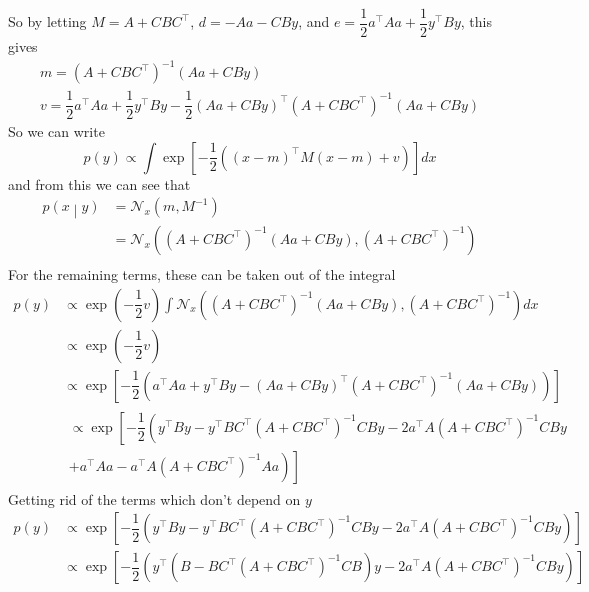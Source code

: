\documentclass[11pt]{report} %
\begin{document}
So by letting $M = A + CBC^{\top}$, $d = -Aa - CBy$, and $e = \dfrac{1}{2}a^{\top}Aa + \dfrac{1}{2}y^{\top}By$, this gives
\begin{gather}
m = \left(A + CBC^{\top}\right)^{-1}\left(Aa + CBy\right) \\
v = \dfrac{1}{2}a^{\top}Aa + \dfrac{1}{2}y^{\top}By - \dfrac{1}{2}\left(Aa + CBy\right)^{\top}\left(A + CBC^{\top}\right)^{-1}\left(Aa + CBy\right)
\end{gather}
So we can write
\begin{equation}
p\left(y\right)\propto\int\exp\left[-\dfrac{1}{2}\left(\left(x-m\right)^{\top}M\left(x-m\right)+v\right)\right]dx
\end{equation}
and from this we can see that
\begin{align}
p\left(x\middle|y\right) &= \mathcal{N}_{x}\left(m, M^{-1}\right) \\
&= \mathcal{N}_{x}\left(\left(A + CBC^{\top}\right)^{-1}\left(Aa + CBy\right), \left(A + CBC^{\top}\right)^{-1}\right) \\
\end{align}
For the remaining terms, these can be taken out of the integral
\begin{align}
p\left(y\right) &\propto \exp\left(-\dfrac{1}{2}v \right)\int \mathcal{N}_{x}\left(\left(A + CBC^{\top}\right)^{-1}\left(Aa + CBy\right), \left(A + CBC^{\top}\right)^{-1}\right) dx \\
&\propto \exp\left(-\dfrac{1}{2}v \right) \\
&\propto \exp\left[-\dfrac{1}{2}\left(a^{\top}Aa + y^{\top}By- \left(Aa + CBy\right)^{\top}\left(A + CBC^{\top}\right)^{-1}\left(Aa + CBy\right)\right) \right] \\
&\begin{multlined} \propto \exp\left[-\dfrac{1}{2}\left(y^{\top}By-y^{\top}BC^{\top}\left(A+CBC^{\top}\right)^{-1}CBy-2a^{\top}A\left(A+CBC^{\top}\right)^{-1}CBy\right.\right. \\
\left.\left. +a^{\top}Aa-a^{\top}A\left(A+CBC^{\top}\right)^{-1}Aa\right)\right]
\end{multlined}
\end{align}
Getting rid of the terms which don't depend on $y$
\begin{align}
p\left(y\right) &\propto \exp\left[-\dfrac{1}{2}\left(y^{\top}By-y^{\top}BC^{\top}\left(A+CBC^{\top}\right)^{-1}CBy-2a^{\top}A\left(A+CBC^{\top}\right)^{-1}CBy\right)\right] \\
&\propto \exp\left[-\dfrac{1}{2}\left(y^{\top}\left(B - BC^{\top}\left(A+CBC^{\top}\right)^{-1}CB\right)y-2a^{\top}A\left(A+CBC^{\top}\right)^{-1}CBy\right)\right]
\end{align}
\end{document}
